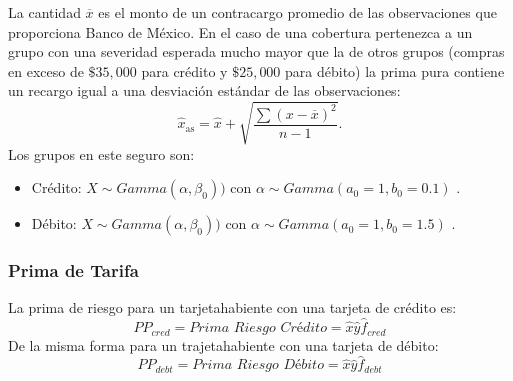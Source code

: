 \documentclass{article}
\begin{document}
La cantidad $\overline{x}$ es el monto de un contracargo promedio de las observaciones que proporciona Banco de México. En el caso de una cobertura pertenezca a un grupo con una severidad esperada mucho mayor que la de otros grupos (compras en exceso de $\$ 35,000$ para crédito y $\$25, 000$ para débito) la prima pura contiene un recargo igual a una desviación estándar de las observaciones: 
\begin{equation*}
    \hat{x}_{\text{as} } = \hat{x} + \sqrt{\frac{
    \sum ( x - \overline{x} )^2 }{n -1}} .
\end{equation*}
Los grupos en este seguro son:
\begin{itemize}
    \item Crédito: $X \sim Gamma(\alpha, \beta_0))$ con 
    $\alpha \sim Gamma(a_0 = 1, b_0 = 0.1)$ .
    \item Débito: $X \sim Gamma(\alpha, \beta_0))$ con 
    $\alpha \sim Gamma(a_0 = 1, b_0 = 1.5)$ . 
\end{itemize}
\subsubsection*{Prima de Tarifa}
La prima de riesgo para un tarjetahabiente con una tarjeta de crédito es: 
\begin{equation*}
    PP_{cred} = \textit{Prima Riesgo Crédito} =   \hat{x}  \hat{y} \hat{f}_{cred} 
\end{equation*}
De la misma forma para un trajetahabiente con una tarjeta de débito: 
\begin{equation*}
    PP_{debt} = \textit{Prima Riesgo Débito} =   \hat{x}  \hat{y} \hat{f}_{debt} 
\end{equation*}
\end{document}
